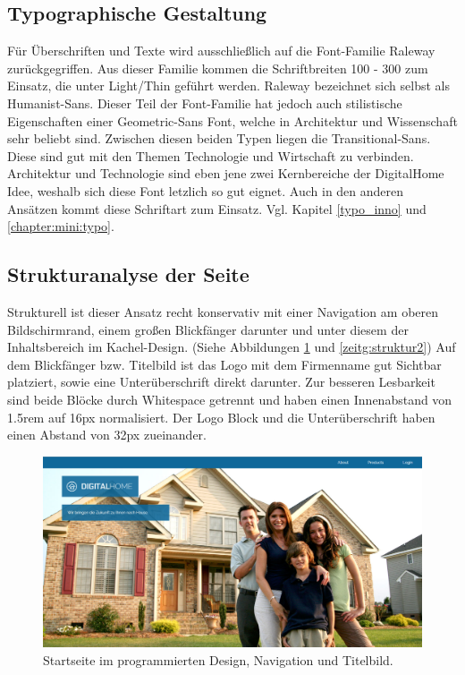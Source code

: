 \subsection{Typographische Gestaltung}
\label{typo_zeit}
Für Überschriften und Texte wird ausschließlich auf die Font-Familie Raleway zurückgegriffen. Aus dieser Familie kommen die Schriftbreiten 100 - 300 zum Einsatz, die unter Light/Thin geführt werden. Raleway bezeichnet sich selbst als Humanist-Sans. Dieser Teil der Font-Familie hat jedoch auch stilistische Eigenschaften einer Geometric-Sans Font, welche in Architektur und Wissenschaft sehr beliebt sind. Zwischen diesen beiden Typen liegen die Transitional-Sans. Diese sind gut mit den Themen Technologie und Wirtschaft zu verbinden. Architektur und Technologie sind eben jene zwei Kernbereiche der DigitalHome Idee, weshalb sich diese Font letzlich so gut eignet.
Auch in den anderen Ansätzen kommt diese Schriftart zum Einsatz. Vgl. Kapitel \ref{typo_inno} und \ref{chapter:mini:typo}.

\subsection{Strukturanalyse der Seite}\label{zeitg:struktur}
Strukturell ist dieser Ansatz recht konservativ mit einer Navigation am oberen Bildschirmrand, einem großen Blickfänger darunter und unter diesem der Inhaltsbereich im Kachel-Design. (Siehe Abbildungen \ref{zeitg:struktur1} und \ref{zeitg:struktur2})
Auf dem Blickfänger bzw. Titelbild ist das Logo mit dem Firmenname gut Sichtbar platziert, sowie eine Unterüberschrift direkt darunter. Zur besseren Lesbarkeit sind beide Blöcke durch Whitespace getrennt und haben einen Innenabstand von 1.5rem auf 16px normalisiert. Der Logo Block und die Unterüberschrift haben einen Abstand von 32px zueinander.

\begin{figure} [ht]
	\includegraphics[width=\textwidth]{./img/zeitg_struktur1.png}
	\caption{Startseite im programmierten Design, Navigation und Titelbild.}
	\label{zeitg:struktur1}
\end{figure}

